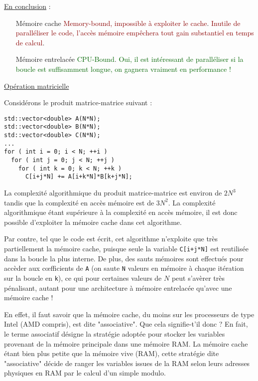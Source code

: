 \documentclass[fleqn,11pt]{article}
\begin{document}
\underline{En conclusion} :
\begin{itemize}
\item [Mémoire cache] \textcolor{darkred}{Memory-bound, impossible à exploiter le cache}. \textcolor{darkred}{Inutile de paralléliser le code, l'accès mémoire empêchera tout gain substantiel en temps de calcul}.
\item [Mémoire entrelacée] \textcolor{darkgreen}{CPU-Bound}. \textcolor{darkgreen}{Oui, il est intéressant de paralléliser si la boucle est suffisamment longue, on gagnera vraiment en performance !}
\end{itemize}

\underline{Opération matricielle}

Considérons le produit matrice-matrice suivant :

\begin{lstlisting}
std::vector<double> A(N*N);
std::vector<double> B(N*N);
std::vector<double> C(N*N);
...
for ( int i = 0; i < N; ++i )
  for ( int j = 0; j < N; ++j )
    for ( int k = 0; k < N; ++k )
      C[i+j*N] += A[i+k*N]*B[k+j*N];
\end{lstlisting}

La complexité algorithmique du produit matrice-matrice est environ de $2N^{3}$ tandis que la complexité en accès
mémoire est de $3N^{2}$. La complexité algorithmique étant supérieure à la complexité en accès mémoire, il est donc possible d'exploiter la mémoire cache dans cet algorithme.

Par contre, tel que le code est écrit, cet algorithme n'exploite que très partiellement la mémoire cache,
puisque seule la variable \texttt{C[i+j*N]} est reutilisée dans la boucle la plus interne. De plus, des sauts
mémoires sont effectués pour accèder aux c{\oe}fficients de \texttt{A} (on saute \texttt{N} valeurs en mémoire à chaque itération sur la boucle en \texttt{k}), ce qui pour certaines valeurs de $N$ peut s'avèrer très pénalisant, autant pour une architecture à mémoire entrelacée qu'avec une mémoire cache !

En effet, il faut savoir que la mémoire cache, du moins sur les processeurs de type Intel (AMD compris),
 est dite "associative". Que cela signifie-t'il donc ? En fait, le terme associatif
désigne la stratégie adoptée pour stocker les variables provenant de la mémoire principale dans une mémoire RAM. La mémoire cache étant bien plus petite que la mémoire vive (RAM), cette stratégie dite "associative"
décide de ranger les variables issues de la RAM selon leurs adresses physiques en RAM par le calcul d'un simple modulo.
\end{document}
